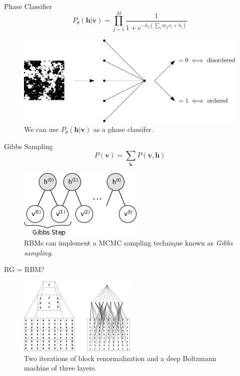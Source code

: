 \documentclass{beamer}
\newcommand{\bolds}[1]{\boldsymbol{#1}}
\newcommand{\bh}{\bolds{h}}
\newcommand{\bv}{\bolds{v}}
\begin{document}
\begin{frame}{Phase Classifier}
  \begin{equation}
    \boxed{P_\theta(\bh|\bv)=\prod_{j=1}^M \frac{1}{1+e^{-h_j(\sum_i w_{ij} v_i +b_j )}}
    }\label{eq:v-to-h}
  \end{equation}%
  \begin{figure}[ht]
    \centering
    \includegraphics[height=0.5\lineheight]{figures/classifier.png}
    \caption{We can use $P_\theta(\bh\rvert\bv)$ as a phase
      classifer.}
  \end{figure}


\end{frame}

\begin{frame}{Gibbs Sampling}
  \begin{equation}%
    \boxed{P(\bv)=\sum_{\bh}P(\bv,\bh)}
  \end{equation}%

  \begin{figure}[ht]
    \centering
    \includegraphics[width=0.5\linewidth]{figures/gibbs_steps.png}
    \caption{RBMs can implement a MCMC sampling technique known as
      \textit{Gibbs sampling}.}
  \end{figure}

\end{frame}


\begin{frame}{RG = RBM?}
  \begin{figure}[ht]
    \centering
    \includegraphics[width=0.5\textwidth]{figures/rg-rbm.png}
    \caption{Two iterations of block renormalization and a deep
      Boltzmann machine of three layers.\label{fig:rbm-rg} }
  \end{figure}
\end{frame}
\end{document}
